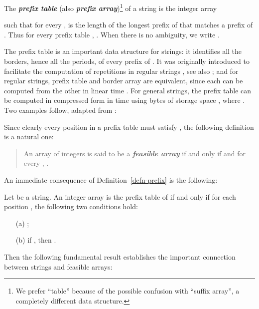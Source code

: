 \documentclass[runningheads,a4paper]{llncs}
\def\s#1{\mbox{\boldmath }}
\def\itbf#1{\textit{\textbf{#1}}}
\begin{document}
\begin{definition}
\label{defn-prefix}
The \itbf{prefix table} (also \itbf{prefix array})\footnote{
We prefer ``table'' because of the possible confusion with ``suffix array'',
a completely different data structure.}
of a string  is the integer array

such that for every ,  is the
length of the longest prefix of  that matches a prefix of .
Thus for every prefix table , .
When there is no ambiguity, we write .
\end{definition}
The prefix table is an important data structure for strings:
it identifies all the borders, hence all the periods,
of every prefix of \s{x} \cite{CRSW13}.
It was originally introduced to facilitate the computation of
repetitions in regular strings \cite{ML84}, see also \cite{S03};
and for regular strings, prefix table and border array are equivalent,
since each can be computed from the other in linear time \cite{BKS13}.
For general strings, the prefix table can be computed in compressed form in  time
using  bytes of storage space \cite{SW08},
where .
Two examples follow, adapted from \cite{CRSW13}:



Since clearly every position  in a prefix table \s{\pi}
must satisfy , the following definition is a natural one:
\begin{quote}
An array  of integers is said to be a \itbf{feasible array}
if and only if  and for every ,
.
\end{quote}

An immediate consequence of Definition~\ref{defn-prefix} is the following:
\begin{lemma}
\label{lemm-easy}
Let  be a string.
An integer array  is the prefix table
of  if and only if for each position ,
the following two conditions hold:
\begin{itemize}
\item[(a)] ;
\item[(b)] if , then .
\end{itemize}
\end{lemma}
Then the following fundamental result establishes the important connection
between strings and feasible arrays:
\end{document}

